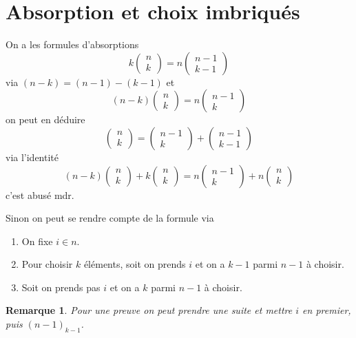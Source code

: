 \documentclass[a4paper,12pt]{book}
\theoremstyle{plain}
\newtheorem{rem}{Remarque}
\theoremstyle{definition}
\theoremstyle{remark}
\begin{document}
\section{Absorption et choix imbriqués}
On a les formules d'absorptions 
\[k\begin{pmatrix}n\\k\end{pmatrix}=n\begin{pmatrix}n-1\\k-1\end{pmatrix}\]
via $(n-k)=(n-1)-(k-1)$ et
\[(n-k)\begin{pmatrix}n\\k\end{pmatrix}=n\begin{pmatrix}n-1\\k\end{pmatrix}\]
on peut en déduire
\[\begin{pmatrix}n\\k\end{pmatrix}=\begin{pmatrix}n-1\\k\end{pmatrix}+\begin{pmatrix}n-1\\k-1\end{pmatrix}\]
via l'identité 
\[(n-k)\begin{pmatrix}n\\k\end{pmatrix}+k\begin{pmatrix}n\\k\end{pmatrix}=n\begin{pmatrix}n-1\\k\end{pmatrix}+n\begin{pmatrix}n\\k\end{pmatrix}\]
c'est abusé mdr.

Sinon on peut se rendre compte de la formule via 
\begin{enumerate}
  \item On fixe $i\in n$.
  \item Pour choisir $k$ éléments, soit on
    prends $i$ et on a $k-1$ parmi $n-1$ à
    choisir.
  \item Soit on prends pas $i$ et on a $k$
    parmi $n-1$ à choisir.
\end{enumerate}
\begin{rem}
  Pour une preuve on peut prendre une suite et mettre
  $i$ en premier, puis $(n-1)_{k-1}$.
\end{rem}
\end{document}
